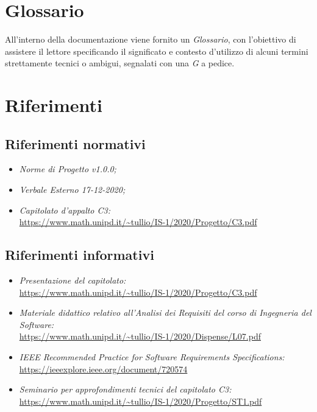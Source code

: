 \section{Glossario}\label{introduzioneGlossario}
All'interno della documentazione viene fornito un \textit{Glossario}, con l'obiettivo di assistere il lettore specificando il significato e contesto d'utilizzo di alcuni termini strettamente tecnici o ambigui, segnalati con una \textit{G} a pedice.

\section{Riferimenti}\label{introduzioneRiferimenti}
\subsection{Riferimenti normativi}\label{introduzioneRiferimentiNormativi}
\begin{itemize}
	\item \textit{Norme di Progetto v1.0.0;}
		\item \textit{Verbale Esterno 17-12-2020;}
		\item \textit{Capitolato d'appalto C3:} \\ \url{https://www.math.unipd.it/~tullio/IS-1/2020/Progetto/C3.pdf}
\end{itemize}
\subsection{Riferimenti informativi}\label{introduzioneRiferimentiInformativi}
\begin{itemize}
	\item \textit{Presentazione del capitolato:} \\ \url{https://www.math.unipd.it/~tullio/IS-1/2020/Progetto/C3.pdf}
		\item \textit{Materiale didattico relativo all'Analisi dei Requisiti del corso di Ingegneria del Software:}\\ \url{https://www.math.unipd.it/~tullio/IS-1/2020/Dispense/L07.pdf}
	\item \textit{IEEE Recommended Practice for Software Requirements Specifications:}\\
		\url{https://ieeexplore.ieee.org/document/720574}
	\item \textit{Seminario per approfondimenti tecnici del capitolato C3:}\\
		\url{https://www.math.unipd.it/~tullio/IS-1/2020/Progetto/ST1.pdf}
\end{itemize}
